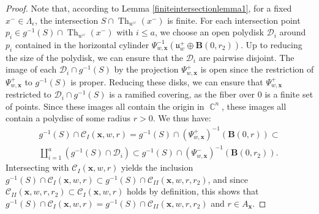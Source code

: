 \documentclass[12pt]{amsbook}%
\theoremstyle{definition}
\theoremstyle{remark}
\numberwithin{section}{chapter}
\numberwithin{subsection}{section}
\numberwithin{figure}{chapter}
\DeclareMathOperator{\C}{\mathbb{C}}
\DeclareMathOperator{\Th}{Th}
\def\bx{\mathbf{x}}
\begin{document}
{{\begin{proof}
Note that, according to Lemma \ref{finiteintersectionlemma1}, 
for a fixed $x^-\in \Lambda_\epsilon$, the intersection $S\cap\Th_{w^\vee}(x^-)$ is finite. 
For each intersection point $p_i \in g^{-1}(S) \cap \Th_{w^{\vee}}(x^-)$ with $i \leqslant a$, we choose an open polydisk $\mathcal{D}_i$ around $p_i$ contained in the horizontal cylinder $\Psi_{w,\bx}^{-1}(\mathfrak{u}_w^+ \oplus \mathbf{B}(0,r_2))$. 
Up to reducing the size of the polydisk, we can ensure that the $\mathcal{D}_i$ are pairwise disjoint.  
 The image of each $\mathcal{D}_i \cap g^{-1}(S)$ by the projection $\Psi_{ w, \bx}^+$ is open  since the restriction of $\Psi_{w,\bx}^+$ to $g^{-1}(S)$ is proper.
Reducing these disks, we can ensure that $\Psi_{w,\bx}^+$ restricted to $\mathcal{D}_i \cap g^{-1}(S)$ is a ramified covering, as the fiber over $0$ is a finite set of points.  
  Since these images all contain the origin in $ \C^n$, these images all contain a polydisc of some radius $r>0$. We thus have: 
\begin{align*}
g^{-1}(S) \cap \mathcal{C}_I(\bx, w,r) = g^{-1}(S) \cap (\Psi_{w,\bx}^{+})^{-1} (\mathbf{B}(0,r)) \subset \\
\coprod_{i=1}^a  (g^{-1}(S) \cap \mathcal{D}_i) \subset g^{-1}(S) \cap (\Psi_{w, \bx}^-)^{-1} (\mathbf{B}(0,r_2)). 
\end{align*} 
 Intersecting with $\mathcal{C}_{I}(\bx,w,r)$ yields the inclusion 
 $ g^{-1}(S) \cap \mathcal{C}_I(\bx,w,r) \subset g^{-1}(S) \cap \mathcal{C}_{II}(\bx,w, r,r_2)$, and since $\mathcal{C}_{II}(\bx,w,r,r_2)  \subset \mathcal{C}_I(\bx, w,r)$ holds by definition, this shows that $g^{-1}(S) \cap \mathcal{C}_I(\bx, w, r) = g^{-1}(S) \cap \mathcal{C}_{II}(\bx,w, r, r_2)$ and $r \in A_{\bx}$.
\smallskip 
  

\end{proof}}}
\end{document}
